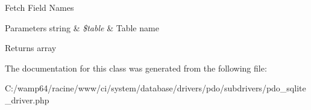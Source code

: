 Fetch Field Names


\begin{DoxyParams}[1]{Parameters}
string & {\em \$table} & Table name \\
\hline
\end{DoxyParams}
\begin{DoxyReturn}{Returns}
array 
\end{DoxyReturn}


The documentation for this class was generated from the following file\+:\begin{DoxyCompactItemize}
\item 
C\+:/wamp64/racine/www/ci/system/database/drivers/pdo/subdrivers/pdo\+\_\+sqlite\+\_\+driver.\+php\end{DoxyCompactItemize}
